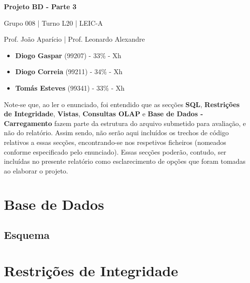 \documentclass[12pt,a4paper]{article}
\begin{document}
  \begin{titlepage}
    \begin{center}
      \vspace*{5cm}

      \Huge
      \textbf{Projeto BD - Parte 3}

      \vspace{0.5cm}
      \LARGE
      Grupo 008 | Turno L20 | LEIC-A

      \vspace{0.5cm}
      \large
      Prof. João Aparício | Prof. Leonardo Alexandre

      \vfill
    \end{center}
    \large
    \begin{itemize}
      \item[] \textbf{Diogo Gaspar} (99207) - 33\% - Xh
      \item[] \textbf{Diogo Correia} (99211) - 34\% - Xh
      \item[] \textbf{Tomás Esteves} (99341) - 33\% - Xh
    \end{itemize}
  \end{titlepage}

  Note-se que, ao ler o enunciado, foi entendido que as secções \textbf{SQL},
  \textbf{Restrições de Integridade}, \textbf{Vistas}, \textbf{Consultas OLAP}
  e \textbf{Base de Dados - Carregamento} fazem parte da estrutura do arquivo
  submetido para avaliação, e não do relatório. Assim sendo, não serão aqui
  incluídos os trechos de código relativos a essas secções, encontrando-se nos
  respetivos ficheiros (nomeados conforme especificado pelo enunciado). Essas
  secções poderão, contudo, ser incluídas no presente relatório como esclarecimento
  de opções que foram tomadas ao elaborar o projeto.

  \section*{Base de Dados}

  \subsection*{Esquema}


  

  \section*{Restrições de Integridade}
\end{document}
